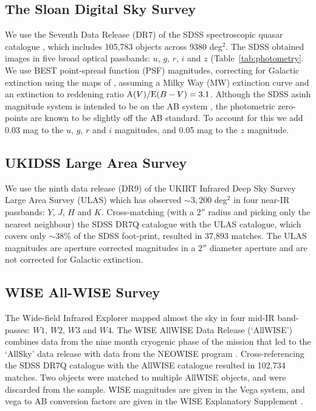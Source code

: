 \subsection{The Sloan Digital Sky Survey}

We use the Seventh Data Release (DR7) of the \ac{SDSS} spectroscopic quasar catalogue \citep{schneider10}, which includes 105,783 objects across 9380 deg$^2$. 
The \ac{SDSS} obtained images in five broad optical passbands: $u$, $g$, $r$, $i$ and $z$ (Table~\ref{tab:photometry}.  
We use BEST point-spread function (PSF) magnitudes, correcting for Galactic extinction using the maps of \citet{schlegel98}, assuming a Milky Way (MW) extinction curve \citep{pei92} and an extinction to reddening ratio ${\rm A}(V) / {\rm E}(B-V) = 3.1$. 
Although the SDSS asinh magnitude system is intended to be on the AB system \citep{oke83}, the photometric zero-points are known to be slightly off the AB standard. 
To account for this we add 0.03 mag to the $u$, $g$, $r$ and $i$ magnitudes, and 0.05 mag to the $z$ magnitude.  

\subsection{UKIDSS Large Area Survey}

We use the ninth data release (DR9) of the UKIRT Infrared Deep Sky Survey \citep[UKIDSS;][]{lawrence07} Large Area Survey (ULAS) which has observed $\sim 3,200$ deg$^2$ in four near-IR passbands: $Y$, $J$, $H$ and $K$. 
Cross-matching (with a 2$''$ radius and picking only the nearest neighbour) the SDSS DR7Q catalogue with the ULAS catalogue, which covers only $\sim 38$\% of the SDSS foot-print, resulted in 37,893 matches. 
The ULAS magnitudes are aperture corrected magnitudes in a 2$''$ diameter aperture and are not corrected for Galactic extinction.

\subsection{WISE All-WISE Survey}

The Wide-field Infrared Explorer \citep[WISE;][]{wright10} mapped almost the sky in four mid-IR band-passes: $W1$, $W2$, $W3$ and $W4$. 
The WISE AllWISE Data Release (`AllWISE') combines data from the nine month cryogenic phase of the mission that led to the `AllSky' data release with data from the NEOWISE program \citep{mainzer11}. 
Cross-referencing the SDSS DR7Q catalogue with the AllWISE catalogue resulted in 102,734 matches. 
Two objects were matched to multiple AllWISE objects, and were discarded from the sample. 
WISE magnitudes are given in the Vega system, and vega to AB conversion factors are given in the WISE Explanatory Supplement \citep{cutri13}. 


